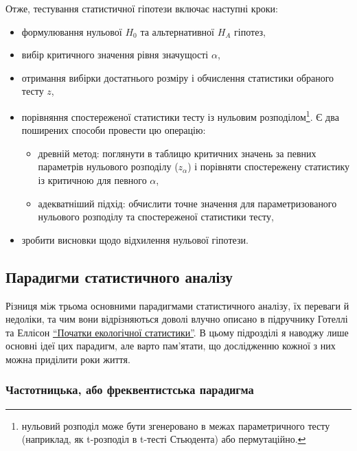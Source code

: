 \documentclass[
  11pt,
]{book}
\begin{document}
Отже, тестування статистичної гіпотези включає наступні кроки:

\begin{itemize}
\item
  формулювання нульової \(H_0\) та альтернативної \(H_A\) гіпотез,
\item
  вибір критичного значення рівня значущості \(\alpha\),
\item
  отримання вибірки достатнього розміру і обчислення статистики обраного тесту \(z\),
\item
  порівняння спостереженої статистики тесту із нульовим розподілом\footnote{нульовий розподіл може бути згенеровано в межах параметричного тесту (наприклад, як t-розподіл в t-тесті Стьюдента) або пермутаційно.}. Є два поширених способи провести цю операцію:

  \begin{itemize}
  \item
    древній метод: поглянути в таблицю критичних значень за певних параметрів нульового розподілу (\(z_{\alpha}\)) і порівняти спостережену статистику із критичною для певного \(\alpha\),
  \item
    адекватніший підхід: обчислити точне значення для параметризованого нульового розподілу та спостереженої статистики тесту,
  \end{itemize}
\item
  зробити висновки щодо відхилення нульової гіпотези.
\end{itemize}

\subsection{Парадигми статистичного аналізу}\label{paradigms}

Різниця між трьома основними парадигмами статистичного аналізу, їх переваги й недоліки, та чим вони відрізняються доволі влучно описано в підручнику Готеллі та Еллісон \href{https://learninglink.oup.com/access/gotelli-a-primer-of-ecological-statistics-2e}{``Початки екологічної статистики''}. В цьому підрозділі я наводжу лише основні ідеї цих парадигм, але варто пам'ятати, що дослідженню кожної з них можна приділити роки життя.

\subsubsection{Частотницька, або фреквентистська парадигма}\label{ux447ux430ux441ux442ux43eux442ux43dux438ux446ux44cux43aux430-ux430ux431ux43e-ux444ux440ux435ux43aux432ux435ux43dux442ux438ux441ux442ux441ux44cux43aux430-ux43fux430ux440ux430ux434ux438ux433ux43cux430}
\end{document}
